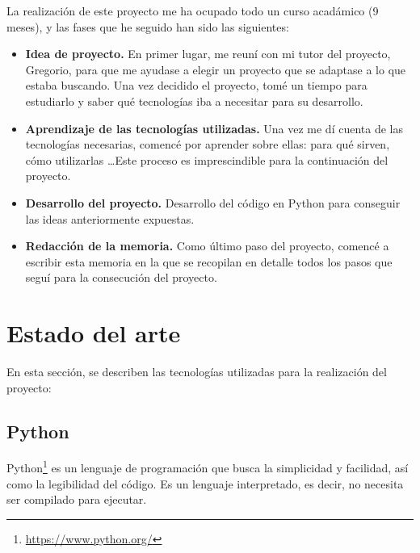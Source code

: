 \documentclass[a4paper, 12pt]{book}
\begin{document}
La realización de este proyecto me ha ocupado todo un curso acadámico (9 meses), y las fases que he seguido han sido las siguientes:
\begin{itemize}
	\item \textbf{Idea de proyecto.} En primer lugar, me reuní con mi tutor del proyecto, Gregorio, para que me ayudase a elegir un proyecto que se adaptase a lo que estaba buscando. Una vez decidido el proyecto, tomé un tiempo para estudiarlo y saber qué tecnologías iba a necesitar para su desarrollo.
	\item \textbf{Aprendizaje de las tecnologías utilizadas.} Una vez me dí cuenta de las tecnologías necesarias, comencé por aprender sobre ellas: para qué sirven, cómo utilizarlas \ldots Este proceso es imprescindible para la continuación del proyecto.
	\item \textbf{Desarrollo del proyecto.} Desarrollo del código en Python para conseguir las ideas anteriormente expuestas.
	\item \textbf{Redacción de la memoria.} Como último paso del proyecto, comencé a escribir esta memoria en la que se recopilan en detalle todos los pasos que seguí para la consecución del proyecto.
\end{itemize}



\cleardoublepage
\chapter{Estado del arte}
\label{chap:estadoarte} %

En esta sección, se describen las tecnologías utilizadas para la realización del proyecto:

\section{Python}
\label{sec:python}

Python\footnote{\url{https://www.python.org/}} es un lenguaje de programación que busca la simplicidad y facilidad, así como la legibilidad del código. Es un lenguaje interpretado, es decir, no necesita ser compilado para ejecutar.\\
\end{document}
